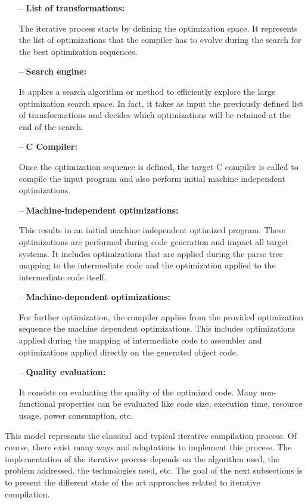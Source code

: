 \begin{itemize}
	\item[--] \textbf{List of transformations:}
	
	The iterative process starts by defining the optimization space. It represents the list of optimizations that the compiler has to evolve during the search for the best optimization sequences.
	
	\item[--] \textbf{Search engine:}
	
	It applies a search algorithm or method to efficiently explore the large optimization search space. In fact, it takes as input the previously defined list of transformations and decides which optimizations will be retained at the end of the search.
	
	\item[--] \textbf{C Compiler:}
	
	Once the optimization sequence is defined, the target C compiler is called to compile the input program and also perform initial machine independent optimizations. 
	
	\item[--] \textbf{Machine-independent optimizations:}
	
	This results in an initial machine independent optimized program. These optimizations are performed during code generation and impact all target systems. It includes optimizations that are applied during the parse tree mapping to the intermediate code and the optimization applied to the intermediate code itself.
	
	\item[--] \textbf{Machine-dependent optimizations:}
	
	For further optimization, the compiler applies from the provided optimization sequence the machine dependent optimizations. This includes optimizations applied during the mapping of intermediate code to assembler and optimizations applied directly on the generated object code.
	
	\item[--] \textbf{Quality evaluation:}
	
	It consists on evaluating the quality of the optimized code. Many non-functional properties can be evaluated like code size, execution time, resource usage, power consumption, etc.
	
\end{itemize}

This model represents the classical and typical iterative compilation process. Of course, there exist many ways and adaptations to implement this process. The implementation of the iterative process depends on the algorithm used, the problem addressed, the technologies used, etc. The goal of the next subsections is to present the different state of the art approaches related to iterative compilation.

